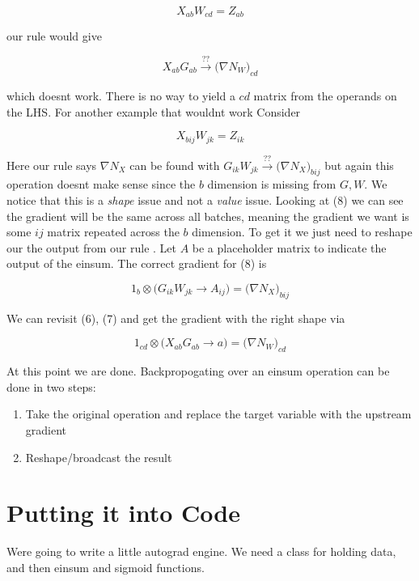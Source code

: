 \documentclass[11pt]{article}
\begin{document}
\begin{equation}
    X_{ab}W_{cd} = Z_{ab}
\end{equation}

our rule would give

\begin{equation}
    X_{ab}G_{ab} \xrightarrow[]{??} \bigl(\nabla N_W\bigr)_{cd}    
\end{equation}

which doesnt work. There is no way to yield a $cd$ matrix from the operands on the LHS.
For another example that wouldnt work Consider

\begin{equation}
    X_{bij}W_{jk} = Z_{ik}
\end{equation}

Here our rule says $\nabla N_X$ can be found with $G_{ik}W_{jk} \xrightarrow[]{??} 
\bigl(\nabla N_X\bigr)_{bij}$ but again this operation doesnt make sense since the
$b$ dimension is missing from $G,W$. 
We notice that this is a \emph{shape} issue and not a \emph{value} issue. Looking at (8)
we can see the gradient will be the same across all batches, meaning the gradient we want 
is some $ij$ matrix repeated across the $b$ dimension. To get it we just need to reshape our
the output from our rule . Let $A$ be a placeholder matrix to indicate the output of the einsum. The 
correct gradient for (8) is

\begin{equation}
    1_{b} \otimes\bigl(G_{ik}W_{jk}\rightarrow A_{ij}\bigr) = \bigl(\nabla N_X\bigr)_{bij}
\end{equation}

We can revisit (6), (7) and get the gradient with the right shape via

\begin{equation}
    1_{cd} \otimes \bigl(X_{ab}G_{ab} \rightarrow a\bigr) = \bigl(\nabla N_W\bigr)_{cd}
\end{equation}


At this point we are done. Backpropogating over an einsum operation can be done in two steps:
\begin{enumerate}
    \item Take the original operation and replace the target variable with the upstream gradient
    \item Reshape/broadcast the result
\end{enumerate}

\section*{Putting it into Code}
Were going to write a little autograd engine. 
We need a class for holding data, and then einsum and sigmoid functions.
\end{document}
